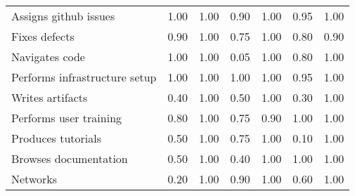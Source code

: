 \begin{tabular}{lrrrrrr}
Assigns github issues & 1.00 & 1.00 & 0.90 & 1.00 & 0.95 & 1.00 \\
Fixes defects & 0.90 & 1.00 & 0.75 & 1.00 & 0.80 & 0.90 \\
Navigates code & 1.00 & 1.00 & 0.05 & 1.00 & 0.80 & 1.00 \\
Performs infrastructure setup & 1.00 & 1.00 & 1.00 & 1.00 & 0.95 & 1.00 \\
Writes artifacts & 0.40 & 1.00 & 0.50 & 1.00 & 0.30 & 1.00 \\
Performs user training & 0.80 & 1.00 & 0.75 & 0.90 & 1.00 & 1.00 \\
Produces tutorials & 0.50 & 1.00 & 0.75 & 1.00 & 0.10 & 1.00 \\
Browses documentation & 0.50 & 1.00 & 0.40 & 1.00 & 1.00 & 1.00 \\
Networks & 0.20 & 1.00 & 0.90 & 1.00 & 0.60 & 1.00 \\
\bottomrule
\end{tabular}
